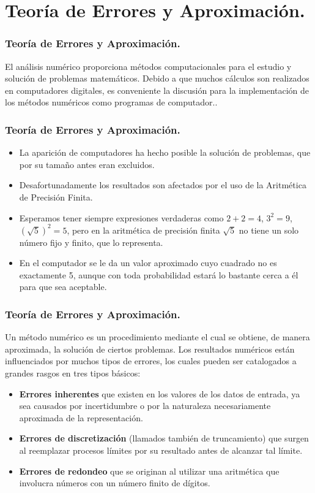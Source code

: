 \documentclass{beamer}
\begin{document}
\section{Teor\'ia de Errores y Aproximaci\'on.}
\begin{frame}[fragile]
  \frametitle{Teor\'ia de Errores y Aproximaci\'on.}
  El an\'alisis num\'erico proporciona m\'etodos computacionales para el estudio y soluci\'on de problemas matem\'aticos. Debido a que muchos c\'alculos son realizados en computadores digitales, es conveniente la discusi\'on para la implementaci\'on de los m\'etodos num\'ericos como programas de computador..
\end{frame}
\begin{frame}[fragile]
  \frametitle{Teor\'ia de Errores y Aproximaci\'on.}
\begin{itemize}
  \item La aparici\'on de computadores ha hecho posible la soluci\'on de problemas, que por su tama\~no antes eran
  excluidos.
  \item<2-> Desafortunadamente los resultados son afectados por el uso de la Aritm\'etica de Precisi\'on Finita.
  \item<3-> Esperamos tener siempre expresiones verdaderas como $2+2=4$, $3^2=9$, $(\sqrt{5})^2 = 5$, pero en la aritm\'etica de precisi\'on finita $\sqrt{5}$ no tiene un solo n\'umero fijo y finito, que lo representa.
  \item<4-> En el computador se le da un valor aproximado cuyo cuadrado no es exactamente 5, aunque con toda probabilidad estar\'a lo bastante cerca a \'el para que
  sea aceptable.
\end{itemize}  
\end{frame}
\begin{frame}
  \frametitle{Teor\'ia de Errores y Aproximaci\'on.}
  Un m\'etodo num\'erico es un procedimiento mediante el cual se obtiene, de manera aproximada, la soluci\'on de ciertos problemas. Los resultados num\'ericos est\'an influenciados por muchos tipos de errores, los cuales pueden ser catalogados a  grandes rasgos en tres tipos b\'asicos:
  
  \begin{itemize}
   \item<2-> \textbf{Errores inherentes} que existen en los valores de los datos de entrada, ya sea causados por incertidumbre o por la naturaleza necesariamente aproximada de la representaci\'on.
    \item<3-> \textbf{Errores de discretizaci\'on} (llamados tambi\'en de truncamiento) que surgen al reemplazar procesos l\'imites por su resultado antes de alcanzar tal l\'imite.
    \item<4-> \textbf{Errores de redondeo} que se originan al utilizar una aritm\'etica que involucra n\'umeros con un n\'umero finito de d\'igitos.
  \end{itemize}
\end{frame}
\end{document}
